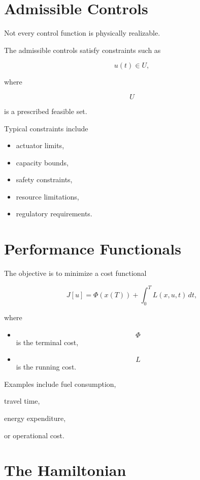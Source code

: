 \documentclass[11pt,fleqn]{book}
\numberwithin{equation}{chapter}
\theoremstyle{plain}
\theoremstyle{definition}
\theoremstyle{remark}
\begin{document}
\section{Admissible Controls}

Not every control function is physically realizable.

The admissible controls satisfy constraints such as

\[
u(t)\in U,
\]

where

\[
U
\]

is a prescribed feasible set.

Typical constraints include

\begin{itemize}
\item actuator limits,
\item capacity bounds,
\item safety constraints,
\item resource limitations,
\item regulatory requirements.
\end{itemize}


\section{Performance Functionals}

The objective is to minimize a cost functional

\[
\boxed{
J[u]
=
\Phi(x(T))
+
\int_{0}^{T}
L(x,u,t)\,dt,
}
\]

where

\begin{itemize}
\item
\[
\Phi
\]
is the terminal cost,

\item
\[
L
\]
is the running cost.
\end{itemize}

Examples include fuel consumption,

travel time,

energy expenditure,

or operational cost.


\section{The Hamiltonian}
\end{document}

